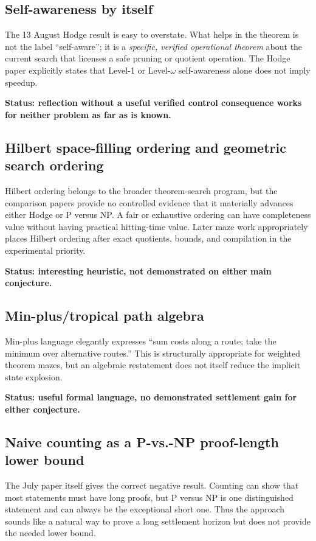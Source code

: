 \documentclass[11pt]{article}
\begin{document}
\subsection{Self-awareness by itself}

The 13 August Hodge result is easy to overstate.  What helps in the theorem is not the label ``self-aware''; it is a \emph{specific, verified operational theorem} about the current search that licenses a safe pruning or quotient operation.  The Hodge paper explicitly states that Level-1 or Level-\(\omega\) self-awareness alone does not imply speedup.

\textbf{Status: reflection without a useful verified control consequence works for neither problem as far as is known.}

\subsection{Hilbert space-filling ordering and geometric search ordering}

Hilbert ordering belongs to the broader theorem-search program, but the comparison papers provide no controlled evidence that it materially advances either Hodge or P versus NP.  A fair or exhaustive ordering can have completeness value without having practical hitting-time value.  Later maze work appropriately places Hilbert ordering after exact quotients, bounds, and compilation in the experimental priority.

\textbf{Status: interesting heuristic, not demonstrated on either main conjecture.}

\subsection{Min-plus/tropical path algebra}

Min-plus language elegantly expresses ``sum costs along a route; take the minimum over alternative routes.''  This is structurally appropriate for weighted theorem mazes, but an algebraic restatement does not itself reduce the implicit state explosion.

\textbf{Status: useful formal language, no demonstrated settlement gain for either conjecture.}

\subsection{Naive counting as a P-vs.-NP proof-length lower bound}

The July paper itself gives the correct negative result.  Counting can show that most statements must have long proofs, but P versus NP is one distinguished statement and can always be the exceptional short one.  Thus the approach sounds like a natural way to prove a long settlement horizon but does not provide the needed lower bound.
\end{document}
